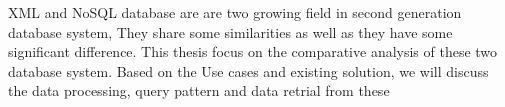 XML and NoSQL database are are two growing field in second generation database system, They share some similarities as well as they have some significant difference. 
This thesis focus on the  comparative analysis of these two database system. Based on the Use cases and existing solution, we will discuss the data processing, query pattern and  data retrial from these
